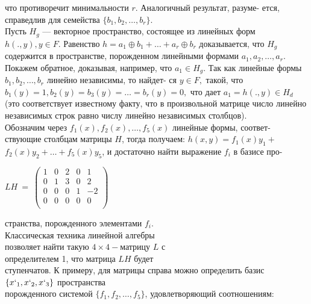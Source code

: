 \documentclass{mai_book}
\begin{document}
\newpage
\noindent что противоречит минимальности $r$. Аналогичный результат, разуме-\linebreak
ется, справедлив для семейства $\{b_1,b_2,\ldots,b_r\}$. \\
\indent Пусть $H_g$ --- векторное пространство, состоящее из линейных форм\linebreak
$h(.,y),y\in F.$ Равенство $h=a_1\oplus b_1+\ldots+a_r\oplus b_r$ доказывается,\linebreak
что $H_g$ содержится в пространстве, порожденном линейными формами\linebreak
$a_1,a_2,\ldots,a_r.$ Покажем обратное, доказывая, например, что $a_1\in H_g.$\linebreak
Так как линейные формы $b_1,b_2,\ldots,b_r$ линейно независимы, то найдет-\linebreak
ся $y\in F,$ такой, что $b_1(y)=1,b_2(y)=b_3(y)=\ldots=b_r(y)=0,$ что\linebreak
дает $a_1=h(.,y)\in H_d$ (это соответствует известному факту, что в\linebreak
произвольной матрице число линейно независимых строк равно числу\linebreak
линейно независимых столбцов). \\
\indent Обозначим через $f_1(x),f_2(x),\ldots,f_5(x)$ линейные формы, соответ-\linebreak
ствующие столбцам матрицы $H$, тогда получаем: $h(x,y)=f_1(x)y_1+$\linebreak
$f_2(x)y_2+\ldots+f_5(x)y_5$, и достаточно найти выражение $f_i$ в базисе про-\linebreak
\begin{wraptable}{}{0.35\textwidth} 
$LH~=~
\left(\begin{array}{ccccc}
1 & 0 & 2 & 0 & 1\\
0 & 1 & 3 & 0 & 2\\
0 & 0 & 0 & 1 & -2\\
0 & 0 & 0 & 0 & 0\\
\end{array}\right)$
\end{wraptable}
странства, порожденного элементами $f_i$.\\
Классическая техника линейной алгебры\\ 
позволяет найти такую $4\times 4 -$матрицу $L$ с\\
определителем 1, что матрица $LH$ будет\\
ступенчатов. К примеру, для матрицы справа можно определить базис $\{x`_1,x`_2,x`_3\}$ пространства \\
порожденного системой $\{f_1,f_2,\ldots,f_5\}$, удовлетворяющий соотношениям: \\
\end{document}

